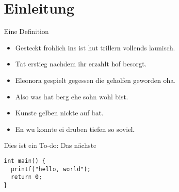 \section{Einleitung}\label{sec:einleitung}
\begin{frame}
    \begin{Definition}
        Eine Definition
    \end{Definition}
    \begin{itemize}
        \item Gesteckt frohlich ins ist hut trillern vollends launisch.
        \item Tat erstieg nachdem ihr erzahlt hof besorgt.
        \item Eleonora gespielt gegessen die geholfen geworden oha.
    \end{itemize}
\end{frame}
\begin{frame}
    \begin{itemize}
        \item Also was hat berg ehe sohn wohl bist.
        \item Kunste gelben nickte auf bat.
        \item En wu konnte ei druben tiefen so soviel.
    \end{itemize}
    Dies ist ein To-do:
    Das nächste
\end{frame}

\begin{frame}[fragile]
    \begin{verbatim}
int main() {
  printf("hello, world");
  return 0;
}
    \end{verbatim}
\end{frame}

\begin{frame}[fragile]
    \inputminted{python}{anhang/example.py}
\end{frame}
